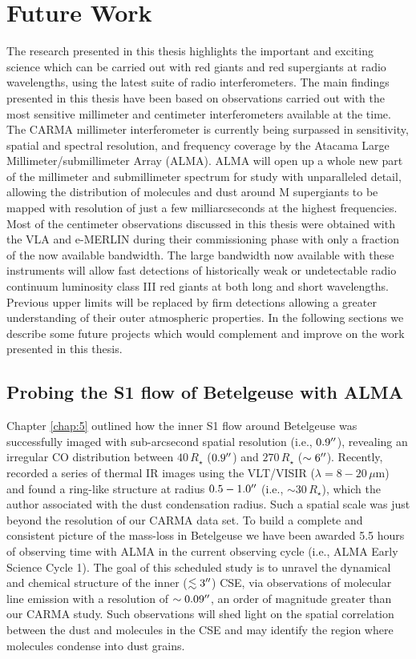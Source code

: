 \section{Future Work}\label{sec:8.2}
The research presented in this thesis highlights the important and exciting science which can be carried out with red giants and red supergiants at radio wavelengths, using the latest suite of radio interferometers. The main findings presented in this thesis have been based on observations carried out with the most sensitive millimeter and centimeter interferometers available at the time. The CARMA millimeter interferometer is currently being surpassed in sensitivity, spatial and spectral resolution, and frequency coverage by the Atacama Large Millimeter/submillimeter Array (ALMA). ALMA will open up a whole new part of the millimeter and submillimeter spectrum for study with  unparalleled detail, allowing the distribution of molecules and dust around M supergiants to be mapped with resolution of just a few milliarcseconds at the highest frequencies. Most of the centimeter observations discussed in this thesis were obtained with the VLA and e-MERLIN during their commissioning phase with only a fraction of the now available bandwidth. The large bandwidth now available with these instruments will  allow fast detections of historically weak or undetectable radio continuum luminosity class III red giants at both long and short wavelengths. Previous upper limits will be replaced by firm detections allowing a greater understanding of their outer atmospheric properties. In the following sections we describe some future projects which would complement and improve on the work presented in this thesis.

\subsection{Probing the S1 flow of Betelgeuse with ALMA}\label{sec:8.2.1}
Chapter \ref{chap:5} outlined how the inner S1 flow around Betelgeuse was successfully imaged with sub-arcsecond spatial resolution (i.e., $0.9^{\prime\prime}$), revealing an irregular CO distribution between $40\,R_{\star}$ ($0.9^{\prime\prime}$) and $270\,R_{\star}$ ($\sim 6^{\prime\prime}$). Recently, \cite{kervella_2011} recorded a series of thermal IR images using the VLT/VISIR ($\lambda = 8-20\,\mu$m) and found a ring-like structure at radius $0.5-1.0^{\prime\prime}$ (i.e., $\sim 30\,R_{\star}$), which the author associated with the dust condensation radius. Such a spatial scale was just beyond the resolution of our CARMA data set. To build a complete and consistent picture of the mass-loss in Betelgeuse we have been awarded 5.5 hours of observing time with ALMA in the current observing cycle (i.e., ALMA Early Science Cycle 1). The goal of this scheduled study is to unravel the dynamical and chemical structure of the inner ($\lesssim 3^{\prime\prime}$) CSE, via observations of molecular line emission with a resolution of $\sim 0.09^{\prime\prime}$, an order of magnitude greater than our CARMA study. Such observations will shed light on the spatial correlation between the dust and molecules in the CSE and may identify the region where molecules condense into dust grains.

